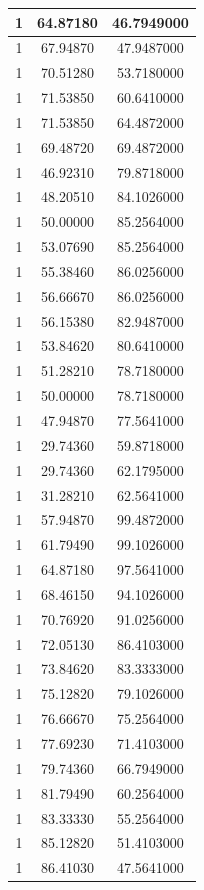 \documentclass[
]{book}
\begin{document}
\begin{tabular}{c|c|c}
\hline
1 & 64.87180 & 46.7949000\\
\hline
1 & 67.94870 & 47.9487000\\
\hline
1 & 70.51280 & 53.7180000\\
\hline
1 & 71.53850 & 60.6410000\\
\hline
1 & 71.53850 & 64.4872000\\
\hline
1 & 69.48720 & 69.4872000\\
\hline
1 & 46.92310 & 79.8718000\\
\hline
1 & 48.20510 & 84.1026000\\
\hline
1 & 50.00000 & 85.2564000\\
\hline
1 & 53.07690 & 85.2564000\\
\hline
1 & 55.38460 & 86.0256000\\
\hline
1 & 56.66670 & 86.0256000\\
\hline
1 & 56.15380 & 82.9487000\\
\hline
1 & 53.84620 & 80.6410000\\
\hline
1 & 51.28210 & 78.7180000\\
\hline
1 & 50.00000 & 78.7180000\\
\hline
1 & 47.94870 & 77.5641000\\
\hline
1 & 29.74360 & 59.8718000\\
\hline
1 & 29.74360 & 62.1795000\\
\hline
1 & 31.28210 & 62.5641000\\
\hline
1 & 57.94870 & 99.4872000\\
\hline
1 & 61.79490 & 99.1026000\\
\hline
1 & 64.87180 & 97.5641000\\
\hline
1 & 68.46150 & 94.1026000\\
\hline
1 & 70.76920 & 91.0256000\\
\hline
1 & 72.05130 & 86.4103000\\
\hline
1 & 73.84620 & 83.3333000\\
\hline
1 & 75.12820 & 79.1026000\\
\hline
1 & 76.66670 & 75.2564000\\
\hline
1 & 77.69230 & 71.4103000\\
\hline
1 & 79.74360 & 66.7949000\\
\hline
1 & 81.79490 & 60.2564000\\
\hline
1 & 83.33330 & 55.2564000\\
\hline
1 & 85.12820 & 51.4103000\\
\hline
1 & 86.41030 & 47.5641000\\

\end{tabular}
\end{document}
